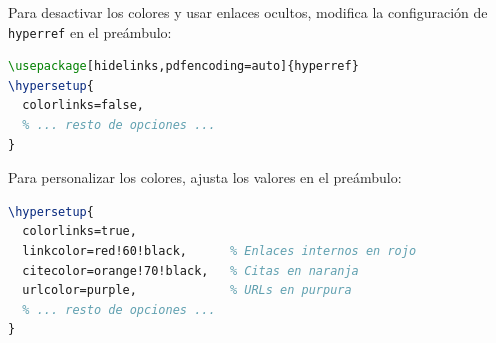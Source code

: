 \documentclass[a4paper,11pt]{report}
\begin{document}
\begin{appendices}
Para desactivar los colores y usar enlaces ocultos, modifica la configuración de \texttt{hyperref} en el preámbulo:

\begin{lstlisting}[language=TeX, caption={Desactivar colores en hipervínculos}]
\usepackage[hidelinks,pdfencoding=auto]{hyperref}
\hypersetup{
  colorlinks=false,
  % ... resto de opciones ...
}
\end{lstlisting}

Para personalizar los colores, ajusta los valores en el preámbulo:

\begin{lstlisting}[language=TeX, caption={Personalizar colores de hipervínculos}]
\hypersetup{
  colorlinks=true,
  linkcolor=red!60!black,      % Enlaces internos en rojo
  citecolor=orange!70!black,   % Citas en naranja
  urlcolor=purple,             % URLs en purpura
  % ... resto de opciones ...
}
\end{lstlisting}

\end{appendices}

\end{document}
